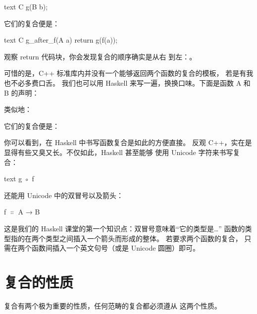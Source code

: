 \begin{snip}{text}
C g(B b);
\end{snip}
它们的复合便是：

\begin{snip}{text}
C g_after_f(A a)
{
    return g(f(a));
}
\end{snip}
观察 return 代码块，你会发现复合的顺序确实是从右
到左：。

可惜的是，C++ 标准库内并没有一个能够返回两个函数的复合的模板，
若是有我也不必多费口舌。
我们也可以用 Haskell 来写一遍，换换口味。下面是函数 A 和 B 的声明：


类似地：

它们的复合便是：

你可以看到，在 Haskell 中书写函数复合是如此的方便直接。
反观 C++，实在是显得有些又臭又长。不仅如此，Haskell 甚至能够
使用 Unicode 字符来书写复合：

\begin{snip}{text}
g ◦ f
\end{snip}

还能用 Unicode 中的双冒号以及箭头：
\begin{snipv}
f \ensuremath{\Colon} A → B
\end{snipv}
这是我们的 Haskell 课堂的第一个知识点：双冒号意味着“它的类型是\ldots{}”
函数的类型指的在两个类型之间插入一个箭头而形成的整体。
若要求两个函数的复合，
只需在两个函数间插入一个英文句号（或是 Unicode 圆圈）即可。

\section{复合的性质}

复合有两个极为重要的性质，任何范畴的复合都必须遵从
这两个性质。

